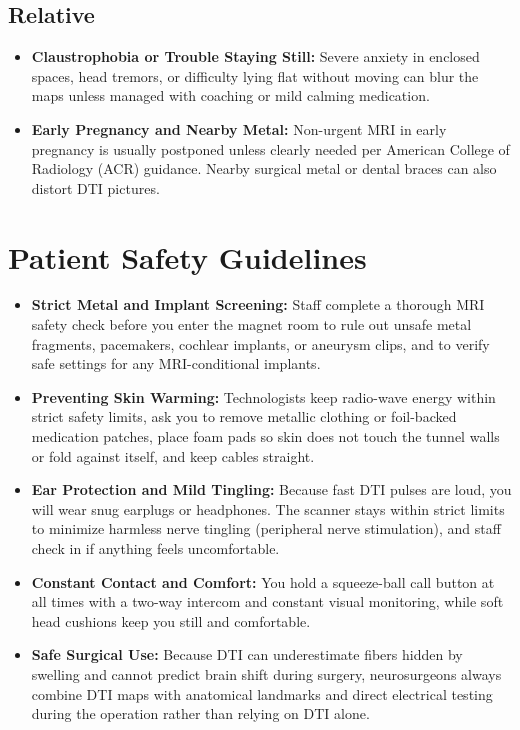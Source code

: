 \subsection{Relative}

\begin{itemize}
    \item \textbf{Claustrophobia or Trouble Staying Still:} Severe anxiety in enclosed spaces, head tremors, or difficulty lying flat without moving can blur the maps unless managed with coaching or mild calming medication.
    \item \textbf{Early Pregnancy and Nearby Metal:} Non-urgent MRI in early pregnancy is usually postponed unless clearly needed per American College of Radiology (ACR) guidance. Nearby surgical metal or dental braces can also distort DTI pictures.
\end{itemize}

\section{Patient Safety Guidelines}

\begin{itemize}
    \item \textbf{Strict Metal and Implant Screening:} Staff complete a thorough MRI safety check before you enter the magnet room to rule out unsafe metal fragments, pacemakers, cochlear implants, or aneurysm clips, and to verify safe settings for any MRI-conditional implants.
    \item \textbf{Preventing Skin Warming:} Technologists keep radio-wave energy within strict safety limits, ask you to remove metallic clothing or foil-backed medication patches, place foam pads so skin does not touch the tunnel walls or fold against itself, and keep cables straight.
    \item \textbf{Ear Protection and Mild Tingling:} Because fast DTI pulses are loud, you will wear snug earplugs or headphones. The scanner stays within strict limits to minimize harmless nerve tingling (peripheral nerve stimulation), and staff check in if anything feels uncomfortable.
    \item \textbf{Constant Contact and Comfort:} You hold a squeeze-ball call button at all times with a two-way intercom and constant visual monitoring, while soft head cushions keep you still and comfortable.
    \item \textbf{Safe Surgical Use:} Because DTI can underestimate fibers hidden by swelling and cannot predict brain shift during surgery, neurosurgeons always combine DTI maps with anatomical landmarks and direct electrical testing during the operation rather than relying on DTI alone.
\end{itemize}

